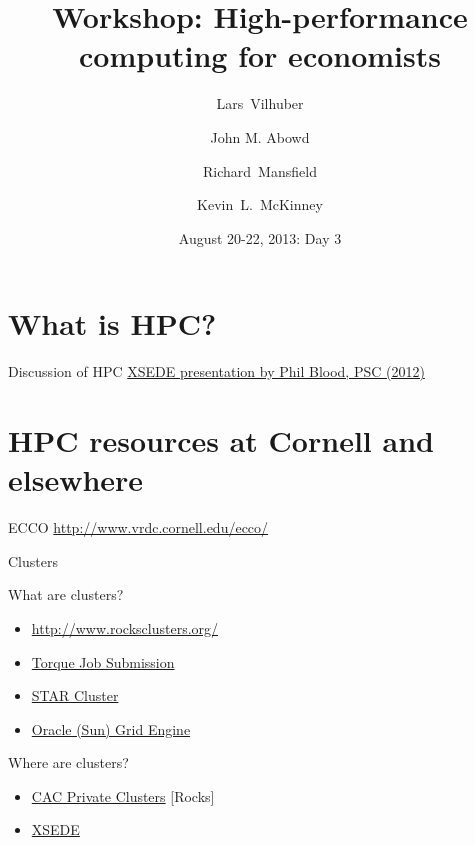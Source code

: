 \documentclass[xcolor=table,compress]{beamer}
\title[Computing for Economists]{Workshop: High-performance computing for economists}
\author[Vilhuber, Abowd, Mansfield, McKinney]{%
  Lars~Vilhuber\inst{1} \and
  John M. Abowd\inst{1} \and
  Richard~Mansfield\inst{1} \and
  Kevin~L.~McKinney %
}
\institute[Cornell]{
  \inst{1}%
   Cornell University, Economics Department,
}%
\date[August 20-22, 2013]{August 20-22, 2013: Day 3}
\begin{document}
\frame{\titlepage}
\section{What is HPC?}

\begin{frame}{Discussion of HPC}
\href{http://www.vrdc.cornell.edu/computing-for-economists/documents/XSEDE_ICE_2012.pdf}{XSEDE
 presentation by Phil Blood, PSC (2012)}
\end{frame}

\section[HPC resources]{HPC resources at Cornell and elsewhere}

\begin{frame}{ECCO}
\href{http://www2.vrdc.cornell.edu/ecco/}{http://www.vrdc.cornell.edu/ecco/}
\end{frame}

\begin{frame}{Clusters}
\begin{block}{What are clusters?}
\begin{itemize}
\item \href{http://www.rocksclusters.org/wordpress/}{http://www.rocksclusters.org/}
\item \href{http://www.clusterresources.com/torquedocs21/2.1jobsubmission.shtml}{Torque Job Submission}
\item \href{http://star.mit.edu/cluster/docs/latest/index.html}{STAR Cluster}
\item \href{http://www.oracle.com/us/products/tools/oracle-grid-engine-075549.html}{Oracle (Sun) Grid Engine}
\end{itemize}
\end{block}

\end{frame}

\begin{frame}{Where are clusters?}
\begin{itemize}
\item \href{http://www.cac.cornell.edu/services/hpcsystems.aspx}{CAC Private Clusters} [Rocks]
\item \href{https://www.xsede.org/}{XSEDE}
\end{itemize}
\end{frame}
\end{document}
